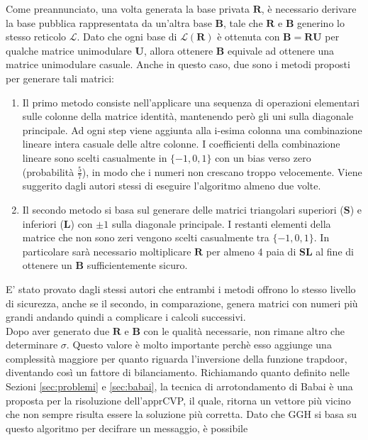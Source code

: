 Come preannunciato, una volta generata la base privata $\mathbf{R}$, è necessario 
derivare la base pubblica rappresentata da un'altra base $\mathbf{B}$, tale che $\mathbf{R}$ 
e $\mathbf{B}$ generino lo stesso reticolo $\mathcal{L}$. Dato che ogni base di 
$\mathcal{L}(\mathbf{R})$ è ottenuta con $\mathbf{B} = \mathbf{R}\mathbf{U}$ per qualche matrice
unimodulare $\mathbf{U}$, allora ottenere $\mathbf{B}$ equivale ad ottenere una matrice
unimodulare casuale. Anche in questo caso, due sono i metodi proposti per generare tali matrici:
\begin{enumerate}
    \item Il primo metodo consiste nell'applicare una sequenza di operazioni elementari 
    sulle colonne della matrice identità, mantenendo però gli uni sulla diagonale principale.
    Ad ogni step viene aggiunta alla i-esima colonna una combinazione lineare intera casuale
    delle altre colonne. I coefficienti della combinazione lineare sono scelti casualmente
    in $\{-1,0,1\}$ con un bias verso zero (probabilità $\frac{5}{7}$), in modo che i numeri non
    crescano troppo velocemente. Viene suggerito dagli autori stessi di eseguire l'algoritmo
    almeno due volte.
    \item Il secondo metodo si basa sul generare delle matrici triangolari superiori 
    ($\mathbf{S}$) e inferiori ($\mathbf{L}$) con $\pm1$ sulla diagonale principale. I 
    restanti elementi della matrice che non sono zeri vengono scelti casualmente tra
    $\{-1,0,1\}$. In particolare sarà necessario moltiplicare $\mathbf{R}$ per almeno 4
    paia di $\mathbf{S}\mathbf{L}$ al fine di ottenere un $\mathbf{B}$ sufficientemente 
    sicuro.
\end{enumerate}
E' stato provato dagli stessi autori che entrambi i metodi offrono lo stesso livello di sicurezza,
anche se il secondo, in comparazione, genera matrici con numeri più grandi andando quindi a 
complicare i calcoli successivi. \\
Dopo aver generato due $\mathbf{R}$ e $\mathbf{B}$ con le qualità necessarie, non
rimane altro che determinare $\sigma$. Questo valore è molto importante perchè esso aggiunge
una complessità maggiore per quanto riguarda l'inversione della funzione trapdoor, diventando
così un fattore di bilanciamento. Richiamando quanto definito nelle Sezioni \ref{sec:problemi}
e \ref{sec:babai}, la tecnica di arrotondamento di Babai è una proposta per la risoluzione 
dell'apprCVP, il quale, ritorna un vettore più vicino che non sempre risulta essere la soluzione più
corretta. Dato che GGH si basa su questo algoritmo per decifrare un messaggio, è possibile
